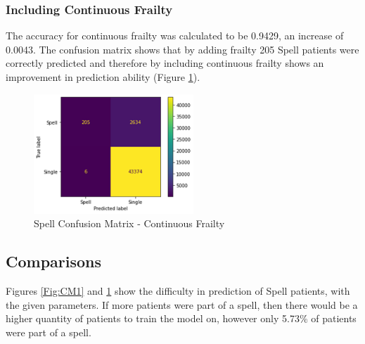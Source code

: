 \documentclass[../thesis.tex]{subfiles}
\begin{document}
\subsubsection{Including Continuous Frailty}
The accuracy for continuous frailty was calculated to be 0.9429, an increase of 0.0043. The confusion matrix shows that by adding frailty 205 Spell patients were correctly predicted and therefore by including continuous frailty shows an improvement in prediction ability (Figure \ref{Fig:CM2}). 
\begin{figure}[h!]
    \centering
    \includegraphics[width = 6cm]{Chapter4/Figures/Matrix2.png}
    \caption{Spell Confusion Matrix - Continuous Frailty}
    \label{Fig:CM2}
\end{figure}
\subsection{Comparisons}
Figures \ref{Fig:CM1} and \ref{Fig:CM2} show the difficulty in prediction of Spell patients, with the given parameters. If more patients were part of a spell, then there would be a higher quantity of patients to train the model on, however only 5.73\% of patients were part of a spell. 
\end{document}
